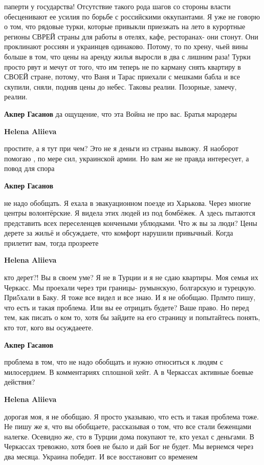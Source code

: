 \begin{itemize}
\begin{itemize}
паперти у государства! Отсутствие такого рода шагов со стороны власти
обесценивают ее усилия по борьбе с российскими оккупантами. Я уже не говорю о
том, что рядовые турки, которые привыкли приезжать на лето в курортные регионы
СВРЕЙ страны для работы в отелях, кафе, ресторанах- они стонут. Они проклинают
россиян и украинцев одинаково. Потому, то по хрену, чьей вины больше в том, что
цены на аренду жилья выросли в два с лишним раза! Турки просто рвут и мечут от
того, что им теперь не по карману снять квартиру в СВОЕЙ стране, потому, что
Ваня и Тарас приехали с мешками бабла и все скупили, сняли, подняв цены до
небес. Таковы реалии. Позорные, замечу, реалии.

\textbf{Акпер Гасанов} да ощущение, что эта Война не про вас. Братья мародеры

\textbf{Helena Aliieva} 

простите, а я тут при чем? Это не я деньги из страны вывожу. Я наоборот помогаю
, по мере сил, украинской армии. Но вам же не правда интересует, а повод для
спора

\textbf{Акпер Гасанов} 

не надо обобщать. Я ехала в эвакуационном поезде из Харькова. Через многие
центры волонтёрские. Я видела этих людей из под бомбёжек. А здесь пытаются
представить всех переселенцев кончеными ублюдками. Что ж вы за люди? Цены
дерете за жильё и обсуждаете, что комфорт нарушили привычный. Когда прилетит
вам, тогда прозреете

\textbf{Helena Aliieva} 

кто дерет?! Вы в своем уме? Я не в Турции и я не сдаю квартиры. Моя семья их
Черкасс. Мы проехали через три границы- румынскую, болгарскую и турецкую.
При5хали в Баку. Я тоже все видел и все знаю. И я не обобщаю. Прлмто пишу, что
есть и такая проблема. Или вы ее отрицать будете? Ваше право. Но перед тем, как
писать о ком то, хотя бы зайдите на его страницу и попытайтесь понять, кто тот,
кого вы осуждаеете.

\textbf{Акпер Гасанов} 

проблема в том, что не надо обобщать и нужно относиться к людям с милосердием.
В комментариях сплошной хейт. А в Черкассах активные боевые действия?

\textbf{Helena Aliieva} 

дорогая моя, я не обобщаю. Я просто указываю, что есть и такая проблема тоже.
Не пишу же я, что вы обобщаете, рассказывая о том, что все стали беженцами
налегке. Осевидно же, сто в Турции дома покупают те, кто уехал с деньгами. В
Черкассах тревожно, хотя боев не было и дай Бог не будет. Мы вернемся через два
месяца. Украина победит. И все восстановит со временем


\end{itemize}
\end{itemize}
